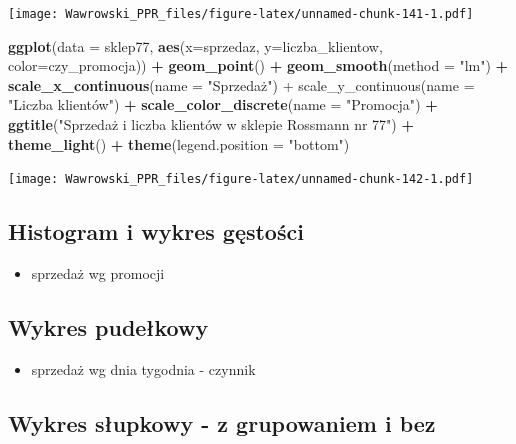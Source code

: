 \documentclass[]{book}
\newenvironment{Shaded}{\begin{snugshade}}{\end{snugshade}}
\newcommand{\KeywordTok}[1]{\textcolor[rgb]{0.13,0.29,0.53}{\textbf{#1}}}
\newcommand{\DataTypeTok}[1]{\textcolor[rgb]{0.13,0.29,0.53}{#1}}
\newcommand{\StringTok}[1]{\textcolor[rgb]{0.31,0.60,0.02}{#1}}
\newcommand{\OperatorTok}[1]{\textcolor[rgb]{0.81,0.36,0.00}{\textbf{#1}}}
\newcommand{\NormalTok}[1]{#1}
\providecommand{\tightlist}{%
  \setlength{\itemsep}{0pt}\setlength{\parskip}{0pt}}
\begin{document}
\texttt{[image: Wawrowski\_PPR\_files/figure-latex/unnamed-chunk-141-1.pdf]}

\begin{Shaded}
\begin{Highlighting}[]
\KeywordTok{ggplot}\NormalTok{(}\DataTypeTok{data =}\NormalTok{ sklep77, }\KeywordTok{aes}\NormalTok{(}\DataTypeTok{x=}\NormalTok{sprzedaz, }\DataTypeTok{y=}\NormalTok{liczba_klientow, }\DataTypeTok{color=}\NormalTok{czy_promocja)) }\OperatorTok{+}
\StringTok{  }\KeywordTok{geom_point}\NormalTok{() }\OperatorTok{+}
\StringTok{  }\KeywordTok{geom_smooth}\NormalTok{(}\DataTypeTok{method =} \StringTok{"lm"}\NormalTok{) }\OperatorTok{+}
\StringTok{  }\KeywordTok{scale_x_continuous}\NormalTok{(}\DataTypeTok{name =} \StringTok{"Sprzedaż") +}
\StringTok{  scale_y_continuous(name = "}\NormalTok{Liczba klientów") }\OperatorTok{+}
\StringTok{  }\KeywordTok{scale_color_discrete}\NormalTok{(}\DataTypeTok{name =} \StringTok{"Promocja"}\NormalTok{) }\OperatorTok{+}
\StringTok{  }\KeywordTok{ggtitle}\NormalTok{(}\StringTok{"Sprzedaż i liczba klientów w sklepie Rossmann nr 77"}\NormalTok{) }\OperatorTok{+}
\StringTok{  }\KeywordTok{theme_light}\NormalTok{() }\OperatorTok{+}
\StringTok{  }\KeywordTok{theme}\NormalTok{(}\DataTypeTok{legend.position =} \StringTok{"bottom"}\NormalTok{)}
\end{Highlighting}
\end{Shaded}

\texttt{[image: Wawrowski\_PPR\_files/figure-latex/unnamed-chunk-142-1.pdf]}

\subsection{Histogram i wykres
gęstości}\label{histogram-i-wykres-gestosci}

\begin{itemize}
\tightlist
\item
  sprzedaż wg promocji
\end{itemize}

\subsection{Wykres pudełkowy}\label{wykres-pudekowy}

\begin{itemize}
\tightlist
\item
  sprzedaż wg dnia tygodnia - czynnik
\end{itemize}

\subsection{Wykres słupkowy - z grupowaniem i
bez}\label{wykres-supkowy---z-grupowaniem-i-bez}
\end{document}
